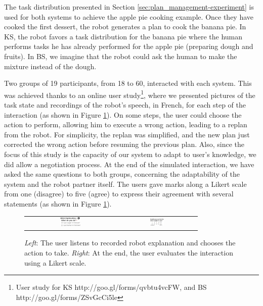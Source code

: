 The task distribution presented in Section \ref{sec:plan_management-experiment} 
is used for both systems to achieve the apple pie cooking example.
Once they have cooked the first dessert, the robot generates a plan to cook the banana pie. 
In KS,  the robot  favors a task distribution for the banana pie where the human performs tasks he has already performed for the apple pie (preparing dough and fruits).
In BS, we imagine that the robot could ask the human to make the mixture instead of the dough.

Two groups of 19 participants, from 18 to 60, interacted with each system. This was achieved thanks to  
an online user study\footnote{User study for KS http://goo.gl/forms/qvbtu4vcFW, and BS http://goo.gl/forms/ZSvGcCi5le}, where we presented pictures of the task state and recordings of the robot's speech, in French, for each step of the interaction (as shown in Figure \ref{fig:plan_management-user_study}).
On some steps, the user could choose the action to perform, allowing him to execute a wrong action, leading to a replan from the robot. For simplicity, the replan was simplified, and the new plan just corrected the wrong action before resuming the previous plan. Also, since the focus of this study is the capacity of our system to adapt to user's knowledge, we did allow a negotiation process.
At the end of the simulated interaction, we have asked the same questions to both groups, concerning the adaptability of the system and the robot partner itself. 
The users gave marks along a Likert scale from one (disagree) to five (agree) to express their agreement with several statements (as shown in Figure \ref{fig:plan_management-user_study}).

\begin{figure}[ht!]
 \centering
 \begin{tabular}{cc}
  \includegraphics[width=0.24\textwidth]{img/plan_management/ustudy9.png} &
  \includegraphics[width=0.19\textwidth]{img/plan_management/ustudy11.png}
 \end{tabular}
 \caption{\textit{Left}: The user listens to recorded robot explanation and chooses the action to take. \textit{Right}: At the end, the user evaluates the interaction using a Likert scale.}
 \label{fig:plan_management-user_study}
 \end{figure}

